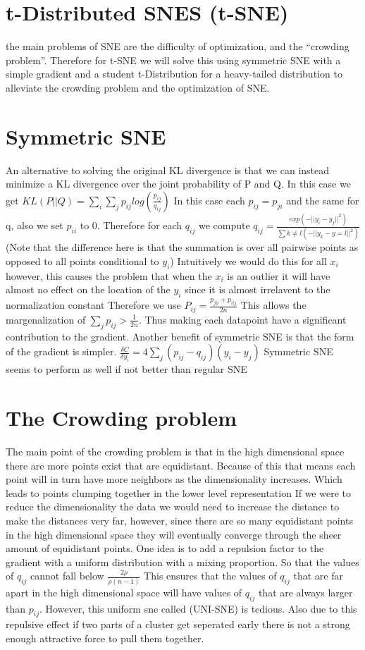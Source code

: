 \documentclass[11pt]{article}
\begin{document}
\section{t-Distributed SNES (t-SNE)}
\label{sec:org22ef07c}
the main problems of SNE are the difficulty of optimization, and the ``crowding problem''.
Therefore for t-SNE we will solve this using symmetric SNE with a simple gradient and a student t-Distribution for a heavy-tailed distribution to alleviate the crowding problem and the optimization of SNE.
\section{Symmetric SNE}
\label{sec:org3e57fb3}
An alternative to solving the original KL divergence is that we can instead minimize a KL divergence over the joint probability of P and Q. In this case we get
\(KL(P||Q) = \sum_i \sum_j p_{ij}log(\frac{p_{ij}}{q_{ij}})\)
In this case each \(p_{ij} = p_{ji}\) and the same for q, also we set \(p_{ii}\) to 0.
Therefore for each \(q_{ij}\) we compute
\(q_{ij} = \frac{exp(-||y_i-y_j||^2)}{\sum{k \neq l}(-||y_k - y=l||^2)}\)
(Note that the difference here is that the summation is over all pairwise points as opposed to all points conditional to \(y_i\))
Intuitively we would do this for all \(x_i\) however, this causes the problem that when the \(x_i\) is an outlier it will have almost no effect on the location of the \(y_i\) since it is almost irrelavent to the normalization constant
Therefore we use \(P_{ij} = \frac{p_{j|i}+p_{i|j}}{2n}\)
This allows the margenalization of \(\sum_j p_{ij} > \frac{1}{2n}\). Thus making each datapoint have a significant contribution to the gradient.
Another benefit of symmetric SNE is that the form of the gradient is simpler.
\(\frac{\delta C}{\delta y_i}=4\sum_j(p_{ij}-q_{ij})(y_i-y_j)\)
Symmetric SNE seems to perform as well if not better than regular SNE
\section{The Crowding problem}
\label{sec:orge063198}
The main point of the crowding problem is that in the high dimensional space there are more points exist that are equidistant. Because of this that means each point will in turn have more neighbors as the dimensionality increases. Which leads to points clumping together in the lower level representation
If we were to reduce the dimensionality the data we would need to increase the distance to make the distances very far, however, since there are so many equidistant points in the high dimensional space they will eventually converge through the sheer amount of equidistant points.
One idea is to add a repulsion factor to the gradient with a uniform distribution with a mixing proportion. So that the values of \(q_{ij}\) cannot fall below \(\frac{2\rho}{\rho (n-1)}\)
This ensures that the values of \(q_{ij}\) that are far apart in the high dimensional space will have values of \(q_{ij}\) that are always larger than \(p_{ij}\).
However, this uniform sne called (UNI-SNE) is tedious. Also due to this repulsive effect if two parts of a cluster get seperated early there is not a strong enough attractive force to pull them together.
\end{document}
